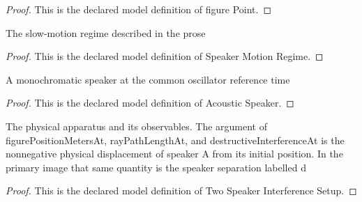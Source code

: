 \begin{proof}
  This is the declared model definition of figure Point.
\end{proof}
\begin{definition}
  \label{def:physics:phyx-mini-0169:phyxminiproblems-problemphyxmini0169-speakermotionregime}
  The slow-motion regime described in the prose
\end{definition}
\begin{proof}
  This is the declared model definition of Speaker Motion Regime.
\end{proof}
\begin{definition}
  \label{def:physics:phyx-mini-0169:phyxminiproblems-problemphyxmini0169-acousticspeaker}
  A monochromatic speaker at the common oscillator reference time
\end{definition}
\begin{proof}
  This is the declared model definition of Acoustic Speaker.
\end{proof}
\begin{definition}
  \label{def:physics:phyx-mini-0169:phyxminiproblems-problemphyxmini0169-twospeakerinterferencesetup}
  The physical apparatus and its observables. The argument of figurePositionMetersAt, rayPathLengthAt, and destructiveInterferenceAt is the nonnegative physical displacement of speaker A from its initial position. In the primary image that same quantity is the speaker separation labelled d
\end{definition}
\begin{proof}
  This is the declared model definition of Two Speaker Interference Setup.
\end{proof}
